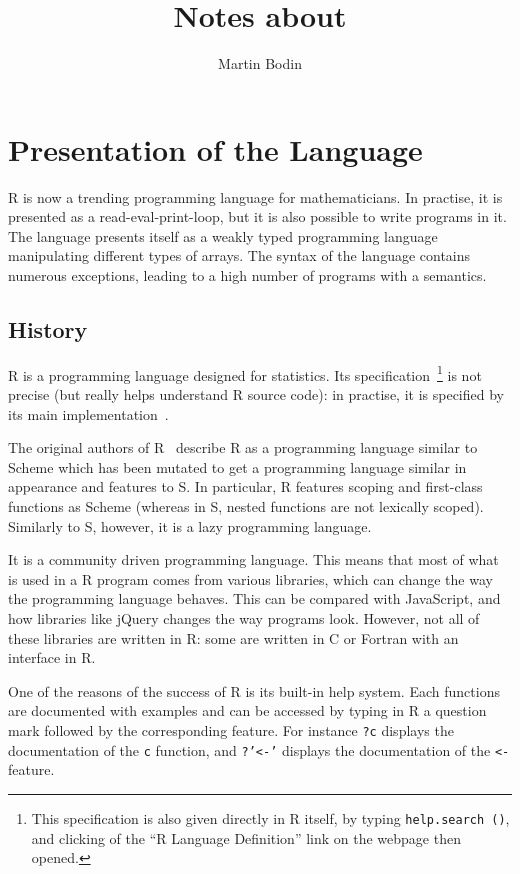 \documentclass{article}
\title{Notes about \R}
\author{Martin Bodin}
\newcommand\R{R}
\newcommand\Cn{C}
\begin{document}
\maketitle

\section{Presentation of the Language}

\R{} is now a trending programming language for mathematicians.
In practise, it is presented as a read-eval-print-loop,
but it is also possible to write programs in it.
The language presents itself as a weakly typed programming language
manipulating different types of arrays.
The syntax of the language contains numerous exceptions,
leading to a high number of programs with a semantics.

\subsection{History}

\R{} is a programming language designed for statistics.
Its specification~\parencite{team2000r}\footnote{
    This specification is also given directly in \R{} itself,
    by typing \texttt{help.search ()},
    and clicking of the “\R{} Language Definition” link
    on the webpage then opened.
} is not precise (but really helps understand \R{} source code):
in practise, it is specified by its main implementation~\parencite{Rwebsite}.

The original authors of \R{}~\parencite{ihaka1996r}
describe \R{} as a programming language similar to Scheme
which has been mutated to get a programming language similar
in appearance and features to S.
In particular, \R{} features scoping and first-class functions
as Scheme
(whereas in S, nested functions are not lexically scoped).
Similarly to S, however, it is a lazy programming language.

It is a community driven programming language.
This means that most of what is used in a \R{} program comes from various libraries,
which can change the way the programming language behaves.
This can be compared with JavaScript,
and how libraries like jQuery changes the way programs look.
However, not all of these libraries are written in \R{}:
some are written in \Cn{} or Fortran
with an interface in \R{}.

One of the reasons of the success of \R{}
is its built-in help system.
Each functions are documented with examples
and can be accessed by typing in \R{}
a question mark followed by the corresponding feature.
For instance \texttt{?c} displays
the documentation of the \texttt{c} function,
and \texttt{?'<-'} displays the documentation
of the \texttt{<-} feature.
\end{document}
